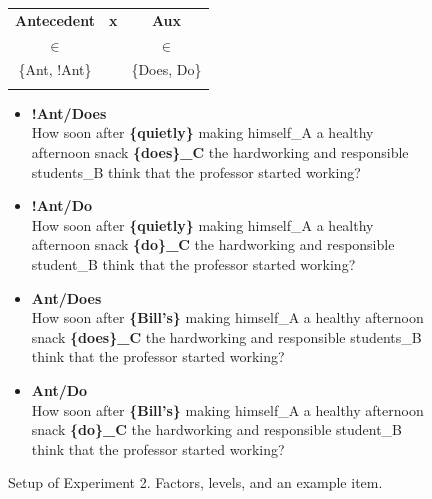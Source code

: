 \documentclass[12pt]{article}
\begin{document}
\begin{figure}[h!]
    \centering
    \begin{tabular}{cll}
    \textbf{Antecedent}                & \multicolumn{1}{c}{\textbf{x}} & \multicolumn{1}{c}{\textbf{Aux}}   \\
    $\in$                         &                       & \multicolumn{1}{c}{$\in$} \\
    \{Ant, !Ant\}                 &                       & \{Does, Do\}              \\
    \multicolumn{1}{l}{\textbf{}} &                       &                          
    \end{tabular}
    \begin{itemize}[label={}]
        \item \textbf{!Ant/Does} \\ How soon after \textbf{\{quietly\}} making himself_A a healthy afternoon snack \textbf{\{does\}_C} the hardworking and responsible students_B think that the professor started working?
        \item \textbf{!Ant/Do} \\ How soon after \textbf{\{quietly\}} making himself_A a healthy afternoon snack \textbf{\{do\}_C} the hardworking and responsible student_B think that the professor started working?
        \item \textbf{Ant/Does} \\ How soon after \textbf{\{Bill's\}} making himself_A a healthy afternoon snack \textbf{\{does\}_C} the hardworking and responsible students_B think that the professor started working?
        \item \textbf{Ant/Do} \\ How soon after \textbf{\{Bill's\}} making himself_A a healthy afternoon snack \textbf{\{do\}_C} the hardworking and responsible student_B think that the professor started working?
    \end{itemize} 
    \caption{Setup of Experiment 2. Factors, levels, and an example item.}
    \label{setupexp2}
\end{figure}
\end{document}
